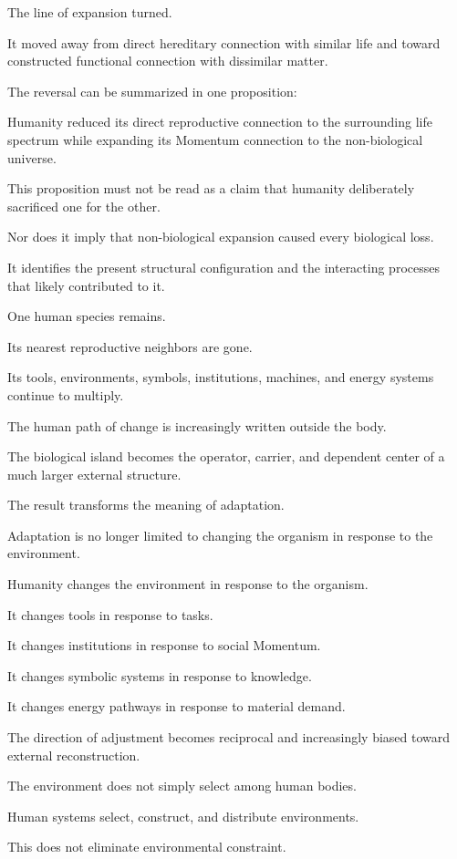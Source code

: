 The line of expansion turned.

It moved away from direct hereditary connection with similar life and toward constructed functional connection with dissimilar matter.

The reversal can be summarized in one proposition:

Humanity reduced its direct reproductive connection to the surrounding life spectrum while expanding its Momentum connection to the non-biological universe.

This proposition must not be read as a claim that humanity deliberately sacrificed one for the other.

Nor does it imply that non-biological expansion caused every biological loss.

It identifies the present structural configuration and the interacting processes that likely contributed to it.

One human species remains.

Its nearest reproductive neighbors are gone.

Its tools, environments, symbols, institutions, machines, and energy systems continue to multiply.

The human path of change is increasingly written outside the body.

The biological island becomes the operator, carrier, and dependent center of a much larger external structure.

The result transforms the meaning of adaptation.

Adaptation is no longer limited to changing the organism in response to the environment.

Humanity changes the environment in response to the organism.

It changes tools in response to tasks.

It changes institutions in response to social Momentum.

It changes symbolic systems in response to knowledge.

It changes energy pathways in response to material demand.

The direction of adjustment becomes reciprocal and increasingly biased toward external reconstruction.

The environment does not simply select among human bodies.

Human systems select, construct, and distribute environments.

This does not eliminate environmental constraint.

